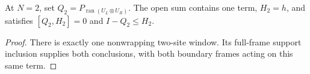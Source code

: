 \begin{theorem}
    \label{thm:mpo_joint_open_two_site_reduction}
    At $N=2$, set $Q_2=P_{\operatorname{ran}(U_L\otimes U_R)}$.
    The open sum contains one term, $H_2=h$, and satisfies
    $[Q_2,H_2]=0$ and $I-Q_2\le H_2$.
\end{theorem}
\begin{proof}
    There is exactly one nonwrapping two-site window. Its full-frame
    support inclusion supplies both conclusions, with both boundary
    frames acting on this same term.
\end{proof}
